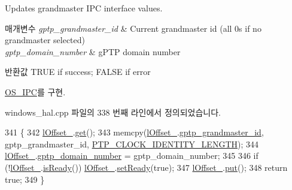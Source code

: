 Updates grandmaster I\+PC interface values. 


\begin{DoxyParams}{매개변수}
{\em gptp\+\_\+grandmaster\+\_\+id} & Current grandmaster id (all 0\textquotesingle{}s if no grandmaster selected) \\
\hline
{\em gptp\+\_\+domain\+\_\+number} & g\+P\+TP domain number\\
\hline
\end{DoxyParams}
\begin{DoxyReturn}{반환값}
T\+R\+UE if success; F\+A\+L\+SE if error 
\end{DoxyReturn}


\hyperlink{class_o_s___i_p_c_a322c3dc7306144448f366a525f634fdf}{O\+S\+\_\+\+I\+PC}를 구현.



windows\+\_\+hal.\+cpp 파일의 338 번째 라인에서 정의되었습니다.


\begin{DoxyCode}
341 \{
342     \hyperlink{class_windows_named_pipe_i_p_c_a5b017962912e5549312d6017c48345a8}{lOffset\_}.\hyperlink{class_lockable_a5a8046fd4b22dbe2b30ef4d18c5ac64e}{get}();
343     memcpy(\hyperlink{class_windows_named_pipe_i_p_c_a5b017962912e5549312d6017c48345a8}{lOffset\_}.\hyperlink{class_offset_a3545e41943aa3080a0817fb8a49fd34c}{gptp\_grandmaster\_id}, gptp\_grandmaster\_id, 
      \hyperlink{ptptypes_8hpp_afd1566058ed7927c2b790c9d4a0051ec}{PTP\_CLOCK\_IDENTITY\_LENGTH});
344     \hyperlink{class_windows_named_pipe_i_p_c_a5b017962912e5549312d6017c48345a8}{lOffset\_}.\hyperlink{class_offset_ac53b4e61c0f960e16c86cfe678ca256d}{gptp\_domain\_number} = gptp\_domain\_number;
345 
346     \textcolor{keywordflow}{if} (!\hyperlink{class_windows_named_pipe_i_p_c_a5b017962912e5549312d6017c48345a8}{lOffset\_}.\hyperlink{class_lockable_offset_acbed040576a7a18e2d9c46b2f15e0162}{isReady}()) \hyperlink{class_windows_named_pipe_i_p_c_a5b017962912e5549312d6017c48345a8}{lOffset\_}.\hyperlink{class_lockable_offset_afc31074bae05a5b224593091da17e149}{setReady}(\textcolor{keyword}{true});
347     \hyperlink{class_windows_named_pipe_i_p_c_a5b017962912e5549312d6017c48345a8}{lOffset\_}.\hyperlink{class_lockable_a760567729cc565fd13d414937a558a89}{put}();
348     \textcolor{keywordflow}{return} \textcolor{keyword}{true};
349 \}
\end{DoxyCode}
